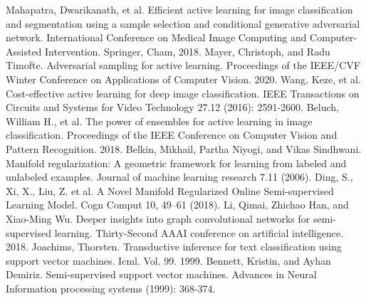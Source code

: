 \documentclass[runningheads]{llncs}
\begin{document}
\begin{thebibliography}{8}
    Mahapatra, Dwarikanath, et al. Efficient active learning for image classification and segmentation using a sample selection and conditional generative adversarial network. International Conference on Medical Image Computing and Computer-Assisted Intervention. Springer, Cham, 2018.
    Mayer, Christoph, and Radu Timofte. Adversarial sampling for active learning. Proceedings of the IEEE/CVF Winter Conference on Applications of Computer Vision. 2020.
    Wang, Keze, et al. Cost-effective active learning for deep image classification. IEEE Transactions on Circuits and Systems for Video Technology 27.12 (2016): 2591-2600.
    Beluch, William H., et al. The power of ensembles for active learning in image classification. Proceedings of the IEEE Conference on Computer Vision and Pattern Recognition. 2018.
    Belkin, Mikhail, Partha Niyogi, and Vikas Sindhwani. Manifold regularization: A geometric framework for learning from labeled and unlabeled examples. Journal of machine learning research 7.11 (2006).
    Ding, S., Xi, X., Liu, Z. et al. A Novel Manifold Regularized Online Semi-supervised Learning Model. Cogn Comput 10, 49–61 (2018).
    Li, Qimai, Zhichao Han, and Xiao-Ming Wu. Deeper insights into graph convolutional networks for semi-supervised learning. Thirty-Second AAAI conference on artificial intelligence. 2018.
    Joachims, Thorsten. Transductive inference for text classification using support vector machines. Icml. Vol. 99. 1999.
    Bennett, Kristin, and Ayhan Demiriz. Semi-supervised support vector machines. Advances in Neural Information processing systems (1999): 368-374.
\end{thebibliography}
\end{document}
